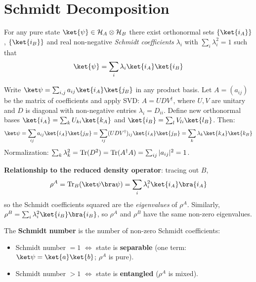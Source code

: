 \documentclass[oneside]{academica}
\begin{document}
\section{Schmidt Decomposition}\label{sec:schmidt}

\begin{theorem*}
  For any pure state $\ket{\psi}\in\mathcal{H}_A\otimes\mathcal{H}_B$ there exist orthonormal sets $\{\ket{i_A}\}$, $\{\ket{i_B}\}$ and real non-negative \emph{Schmidt coefficients} $\lambda_i$ with $\sum_i\lambda_i^2=1$ such that
  \begin{equation*}
    \ket{\psi}=\sum_i\lambda_i\ket{i_A}\ket{i_B}
  \end{equation*}
\end{theorem*}

\begin{proof*}
  Write $\ket\psi=\sum_{i,j}a_{ij}\ket{i_A}\ket{j_B}$ in any product basis.
  Let $A=(a_{ij})$ be the matrix of coefficients and apply SVD: $A=UDV^\dagger$, where $U,V$ are unitary and $D$ is diagonal
  with non-negative entries $\lambda_i=D_{ii}$.
  Define new orthonormal bases $\ket{i_A}=\sum_k U_{ki}\ket{k_A}$ and $\ket{i_B}=\sum_l V_{li}\ket{l_B}$.
  Then:
  \begin{equation*}
    \ket\psi=\sum_{ij}a_{ij}\ket{i_A}\ket{j_B} =\sum_{ij}(UDV^\dagger)_{ij}\ket{i_A}\ket{j_B} =\sum_k\lambda_k\ket{k_A}\ket{k_B}
  \end{equation*}
  Normalization: $\sum_k\lambda_k^2=\operatorname{Tr}(D^2)=\operatorname{Tr}(A^\dagger A)=\sum_{ij}|a_{ij}|^2=1$.
\end{proof*}

\textbf{Relationship to the reduced density operator}: tracing out $B$,
\begin{equation*}
  \rho^A = \tr_B(\ket\psi\bra\psi) = \sum_i\lambda_i^2\ket{i_A}\bra{i_A}
\end{equation*}
so the Schmidt coefficients squared are the \emph{eigenvalues} of $\rho^A$.
Similarly, $\rho^B=\sum_i\lambda_i^2\ket{i_B}\bra{i_B}$, so $\rho^A$ and $\rho^B$ have the same non-zero eigenvalues.

The \textbf{Schmidt number} is the number of non-zero Schmidt coefficients:
\begin{itemize}
  \item Schmidt number $=1$ $\iff$ state is \textbf{separable} (one term: $\ket\psi=\ket{a}\ket{b}$; $\rho^A$ is pure).
  \item Schmidt number $>1$ $\iff$ state is \textbf{entangled} ($\rho^A$ is mixed).
\end{itemize}
\end{document}
